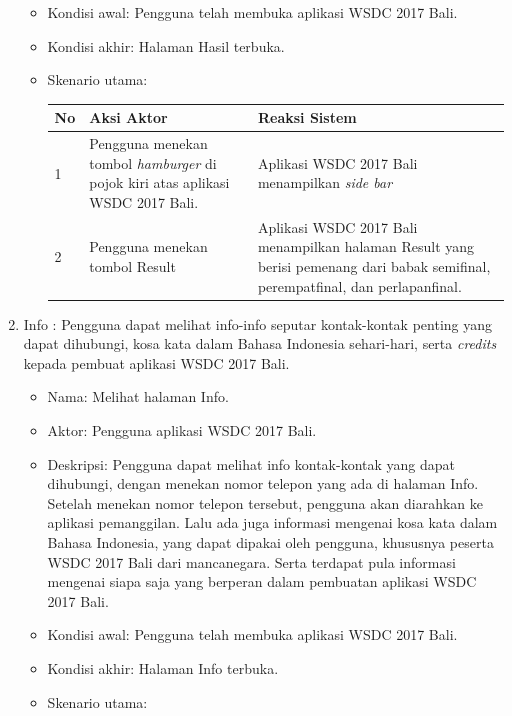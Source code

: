 \begin{enumerate}
\begin{itemize}
		\item Kondisi awal: Pengguna telah membuka aplikasi WSDC 2017 Bali.
		\item Kondisi akhir: Halaman Hasil terbuka.
		\item Skenario utama: \\
		\begin{table}[H]
			\centering
			\begin{tabular}{|p{0.5cm}|p{7cm}|p{7cm}|}
				\hline
				No & Aksi Aktor                               & Reaksi Sistem                                          \\ \hline
				1  & Pengguna menekan tombol {\it hamburger} di pojok kiri atas aplikasi WSDC 2017 Bali. & Aplikasi WSDC 2017 Bali menampilkan {\it side bar} \\ \hline
				2  & Pengguna menekan tombol Result & Aplikasi WSDC 2017 Bali menampilkan halaman Result yang berisi pemenang dari babak semifinal, perempatfinal, dan perlapanfinal. \\ \hline
			\end{tabular}
		\end{table}
	\end{itemize}
	\item Info : Pengguna dapat melihat info-info seputar kontak-kontak penting yang dapat dihubungi, kosa kata dalam Bahasa Indonesia sehari-hari, serta {\it credits} kepada pembuat aplikasi WSDC 2017 Bali.
	\begin{itemize}
		\item Nama: Melihat halaman Info.
		\item Aktor: Pengguna aplikasi WSDC 2017 Bali.
		\item Deskripsi: Pengguna dapat melihat info kontak-kontak yang dapat dihubungi, dengan menekan nomor telepon yang ada di halaman Info. Setelah menekan nomor telepon tersebut, pengguna akan diarahkan ke aplikasi pemanggilan. Lalu ada juga informasi mengenai kosa kata dalam Bahasa Indonesia, yang dapat dipakai oleh pengguna, khususnya peserta WSDC 2017 Bali dari mancanegara. Serta terdapat pula informasi mengenai siapa saja yang berperan dalam pembuatan aplikasi WSDC 2017 Bali.
		\item Kondisi awal: Pengguna telah membuka aplikasi WSDC 2017 Bali.
		\item Kondisi akhir: Halaman Info terbuka.
		\item Skenario utama: \\
		\begin{table}[H]
			\centering
			\begin{tabular}{|p{0.5cm}|p{7cm}|p{7cm}|}

\end{tabular}
\end{table}
\end{itemize}
\end{enumerate}
